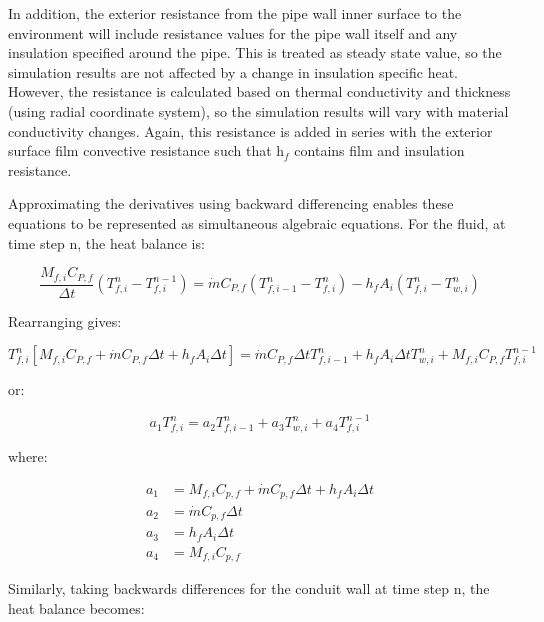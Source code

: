 In addition, the exterior resistance from the pipe wall inner surface to the environment will include resistance values for the pipe wall itself and any insulation specified around the pipe. This is treated as steady state value, so the simulation results are not affected by a change in insulation specific heat. However, the resistance is calculated based on thermal conductivity and thickness (using radial coordinate system), so the simulation results will vary with material conductivity changes. Again, this resistance is added in series with the exterior surface film convective resistance such that h\(_{f}\) contains film and insulation resistance.

Approximating the derivatives using backward differencing enables these equations to be represented as simultaneous algebraic equations. For the fluid, at time step n, the heat balance is:

\begin{equation}
\frac{{{M_{f,i}}{C_{P,f}}}}{{\Delta t}}\left( {T_{f,i}^n - T_{f,i}^{n - 1}} \right) = \dot m{C_{P,f}}\left( {T_{f,i - 1}^n - T_{f,i}^n} \right) - {h_f}{A_i}\left( {T_{f,i}^n - T_{w,i}^n} \right)
\end{equation}

Rearranging gives:

\begin{equation}
T_{f,i}^n\left[ {{M_{f,i}}{C_{P,f}} + \dot m{C_{P,f}}\Delta t + {h_f}{A_i}\Delta t} \right] = \dot m{C_{P,f}}\Delta tT_{f,i - 1}^n + {h_f}{A_i}\Delta tT_{w,i}^n + {M_{f,i}}{C_{P,f}}T_{f,i}^{n - 1}
\end{equation}

or:

\begin{equation}
{a_1}T_{f,i}^n = {a_2}T_{f,i - 1}^n + {a_3}T_{w,i}^n + {a_4}T_{f,i}^{n - 1}
\label{eq:PipeEquation614}
\end{equation}

where:

\begin{equation}
  \begin{array}{rl}
    a_1 &= M_{f,i}C_{p,f} + \dot{m}C_{p,f} \Delta t + h_f A_i \Delta t \\
    a_2 &= \dot{m} C_{p,f} \Delta t \\ 
    a_3 &= h_f A_i \Delta t \\
    a_4 &= M_{f,i} C_{p,f}
  \end{array}
\end{equation}

Similarly, taking backwards differences for the conduit wall at time step n, the heat balance becomes:


